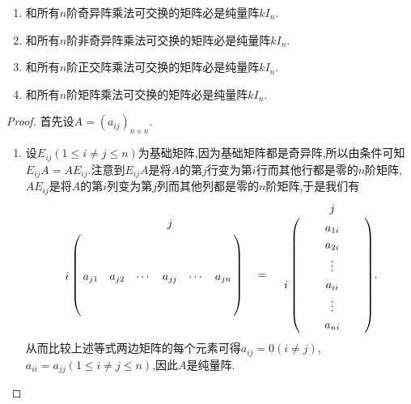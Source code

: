 \documentclass[lang=cn,newtx,10pt,scheme=chinese]{elegantbook}
\begin{document}
\begin{proposition}[纯量矩阵的刻画]\label{proposition:纯量阵的刻画}
\begin{enumerate}[(1)]
\item 和所有\(n\)阶奇异阵乘法可交换的矩阵必是纯量阵\(kI_{n}\).

\item 和所有\(n\)阶非奇异阵乘法可交换的矩阵必是纯量阵\(kI_{n}\).

\item 和所有\(n\)阶正交阵乘法可交换的矩阵必是纯量阵\(kI_{n}\).

\item 和所有\(n\)阶矩阵乘法可交换的矩阵必是纯量阵\(kI_{n}\).
\end{enumerate}

\end{proposition}
\begin{proof}
首先设$A=(a_{ij})_{n\times n}$.
\begin{enumerate}
\item 设\(E_{ij}(1\leq i\neq j\leq n)\)为基础矩阵,因为基础矩阵都是奇异阵,所以由条件可知\(E_{ij}A = AE_{ij}\).注意到\(E_{ij}A\)是将\(A\)的第\(j\)行变为第\(i\)行而其他行都是零的\(n\)阶矩阵,\(AE_{ij}\)是将\(A\)的第\(i\)列变为第\(j\)列而其他列都是零的\(n\)阶矩阵,于是我们有
\begin{align*}
\bordermatrix{%
&    &		&		&		j&		&
\cr
&    &		&		&		&		&		\cr
&   &		&		&		&		&		\cr
i&    a_{j1}&		a_{j2}&		\cdots&		a_{jj}&		\cdots&		a_{jn}
\cr
&    &		&		&		&		&		\cr
&    &		&		&		&		&		\cr
} \quad= \quad \bordermatrix{%
&    &       &             j&     &
\cr
&    &		&		a_{1i}&		&		\cr
&    &		&		a_{2i}&		&		\cr
&    &		&		\vdots&		&		\cr
i&    &		&		a_{ii}&		&		\cr
&    &		&		\vdots&		&		\cr
&    &		&		a_{ni}&		&		\cr
}.
\end{align*}
从而比较上述等式两边矩阵的每个元素可得\(a_{ij}=0(i\neq j)\),\(a_{ii}=a_{jj}(1\leq i\neq j\leq n)\),因此\(A\)是纯量阵.


\end{enumerate}
\end{proof}
\end{document}
